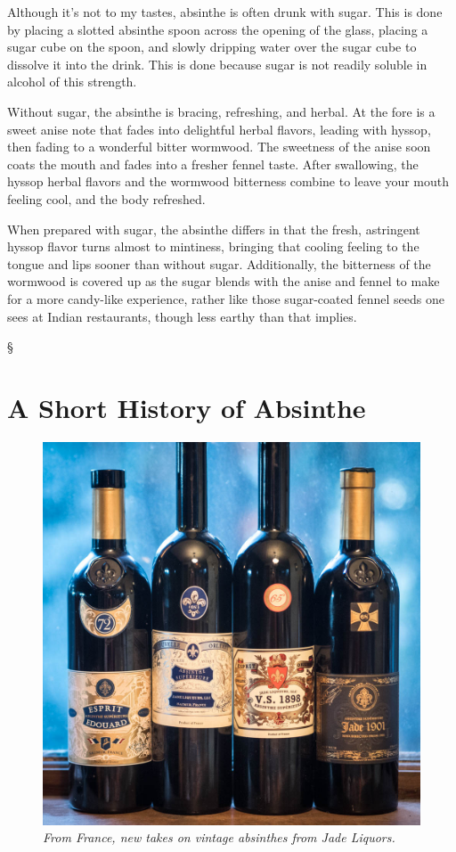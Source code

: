 \documentclass[12pt,letterpaper,oneside]{memoir}
\newcommand\secdiv{
  \begin{center}
    \S
  \end{center}
}
\begin{document}
  Although it's not to my tastes, absinthe is often drunk with sugar.  This is done by placing a slotted absinthe spoon across the opening of the glass, placing a sugar cube on the spoon, and slowly dripping water over the sugar cube to dissolve it into the drink.  This is done because sugar is not readily soluble in alcohol of this strength.

  Without sugar, the absinthe is bracing, refreshing, and herbal.  At the fore is a sweet anise note that fades into delightful herbal flavors, leading with hyssop, then fading to a wonderful bitter wormwood.  The sweetness of the anise soon coats the mouth and fades into a fresher fennel taste.  After swallowing, the hyssop herbal flavors and the wormwood bitterness combine to leave your mouth feeling cool, and the body refreshed.

  When prepared with sugar, the absinthe differs in that the fresh, astringent hyssop flavor turns almost to mintiness, bringing that cooling feeling to the tongue and lips sooner than without sugar.  Additionally, the bitterness of the wormwood is covered up as the sugar blends with the anise and fennel to make for a more candy-like experience, rather like those sugar-coated fennel seeds one sees at Indian restaurants, though less earthy than that implies.

  \secdiv

  \section*{A Short History of Absinthe}

  \begin{figure}
    \vspace{-20pt}
    \includegraphics[width=\linewidth]{../../assets/tasting/naa-french-absinthes.jpg}\\
    \textit{From France, new takes on vintage absinthes from Jade Liquors.}
    \vspace{-50pt}
  \end{figure}
\end{document}
